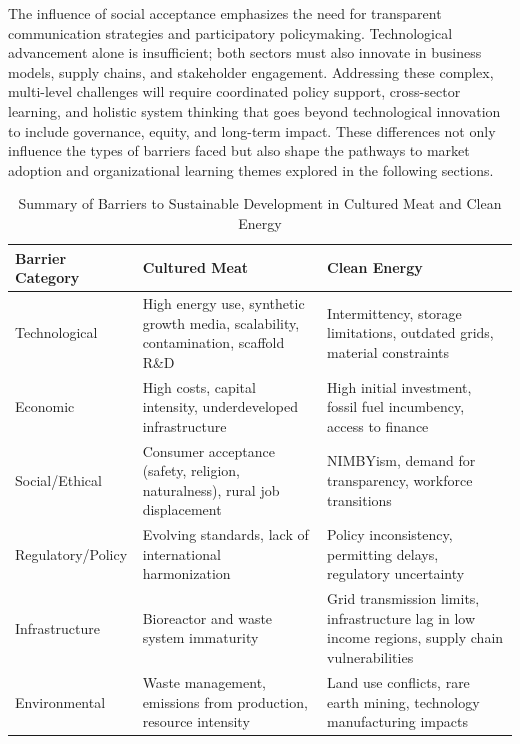 	The influence of social acceptance emphasizes the need for transparent communication strategies and participatory policymaking. Technological advancement alone is insufficient; both sectors must also innovate in business models, supply chains, and stakeholder engagement. Addressing these complex, multi-level challenges will require coordinated policy support, cross-sector learning, and holistic system thinking that goes beyond technological innovation to include governance, equity, and long-term impact. These differences not only influence the types of barriers faced but also shape the pathways to market adoption and organizational learning themes explored in the following sections. \\
	
\begin{table}[h!]
	\centering
	\caption{Summary of Barriers to Sustainable Development in Cultured Meat and Clean Energy}
	\label{tab:barriers_summary}
	\begin{tabularx}{\textwidth}{@{}lXX@{}}
		\toprule
		\textbf{Barrier Category} & \textbf{Cultured Meat}                                                                     & \textbf{Clean Energy}                                                              \\ \midrule
		Technological             & High energy use, synthetic growth media, scalability, contamination, scaffold R\&D          & Intermittency, storage limitations, outdated grids, material constraints        \\ \addlinespace
		Economic                  & High costs, capital intensity, underdeveloped infrastructure                             & High initial investment, fossil fuel incumbency, access to finance             \\ \addlinespace
		Social/Ethical            & Consumer acceptance (safety, religion, naturalness), rural job displacement              & NIMBYism, demand for transparency, workforce transitions                       \\ \addlinespace
		Regulatory/Policy         & Evolving standards, lack of international harmonization                                  & Policy inconsistency, permitting delays, regulatory uncertainty                \\ \addlinespace
		Infrastructure            & Bioreactor and waste system immaturity                                                   & Grid transmission limits, infrastructure lag in low income regions, supply chain vulnerabilities \\ \addlinespace
		Environmental             & Waste management, emissions from production, resource intensity                          & Land use conflicts, rare earth mining, technology manufacturing impacts        \\ \bottomrule
	\end{tabularx}
\end{table}
	
